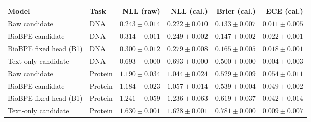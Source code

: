 \begin{tabular}{llrrrr}
\toprule
Model & Task & NLL (raw) & NLL (cal.) & Brier (cal.) & ECE (cal.) \\
\midrule
Raw candidate & DNA & $0.243 \pm 0.014$ & $0.222 \pm 0.010$ & $0.133 \pm 0.007$ & $0.011 \pm 0.005$ \\
BioBPE candidate & DNA & $0.314 \pm 0.011$ & $0.249 \pm 0.002$ & $0.147 \pm 0.002$ & $0.022 \pm 0.001$ \\
BioBPE fixed head (B1) & DNA & $0.300 \pm 0.012$ & $0.279 \pm 0.008$ & $0.165 \pm 0.005$ & $0.018 \pm 0.001$ \\
Text-only candidate & DNA & $0.693 \pm 0.000$ & $0.693 \pm 0.000$ & $0.500 \pm 0.000$ & $0.004 \pm 0.003$ \\
Raw candidate & Protein & $1.190 \pm 0.034$ & $1.044 \pm 0.024$ & $0.529 \pm 0.009$ & $0.054 \pm 0.011$ \\
BioBPE candidate & Protein & $1.184 \pm 0.023$ & $1.057 \pm 0.014$ & $0.539 \pm 0.004$ & $0.049 \pm 0.002$ \\
BioBPE fixed head (B1) & Protein & $1.241 \pm 0.059$ & $1.236 \pm 0.063$ & $0.619 \pm 0.037$ & $0.042 \pm 0.014$ \\
Text-only candidate & Protein & $1.630 \pm 0.001$ & $1.628 \pm 0.001$ & $0.781 \pm 0.000$ & $0.009 \pm 0.007$ \\
\bottomrule
\end{tabular}
